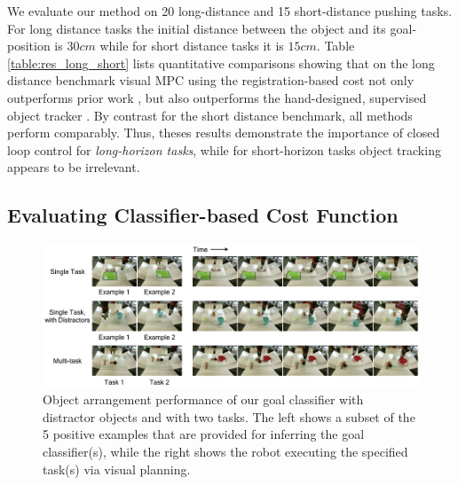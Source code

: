 


We evaluate our method on 20 long-distance and 15 short-distance pushing tasks. For long distance tasks the initial distance between the object and its goal-position is $30cm$ while for short distance tasks it is $15cm$. Table \ref{table:res_long_short} lists quantitative comparisons showing that on the long distance benchmark visual MPC using the registration-based cost not only outperforms prior work \cite{sna}, but also outperforms the hand-designed, supervised object tracker \cite{babenko2009visual}. By contrast for the short distance benchmark, all methods perform comparably. Thus, theses results demonstrate the importance of closed loop control for \emph{long-horizon tasks}, while for short-horizon tasks object tracking appears to be irrelevant. 

\subsection{Evaluating Classifier-based Cost Function}
\label{subsec:eval_classifier}

\begin{figure}
	\centering
	\includegraphics[width=1.0\columnwidth]{images_cls/cls_results.jpeg}
	\caption{\small Object arrangement performance of our goal classifier with distractor objects and with two tasks. The left shows a subset of the 5 positive examples that are provided for inferring the goal classifier(s), while the right shows the robot executing the specified task(s) via visual planning.}
	\label{fig:cls_results}
	\vspace{-0.3cm}
\end{figure}

